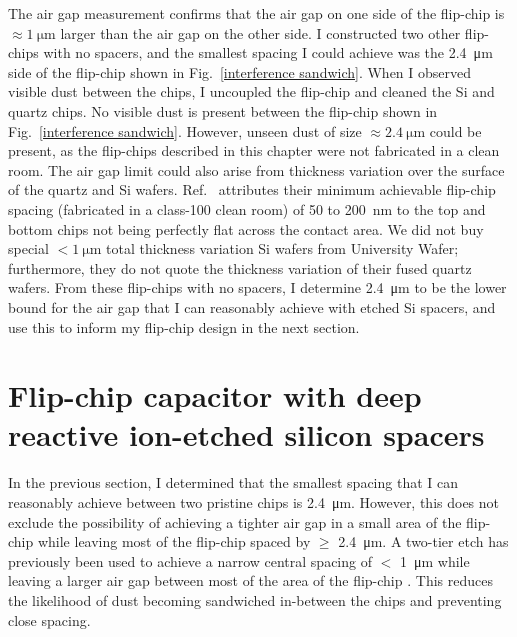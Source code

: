 \documentclass{beavtex_dub_edit}
\begin{document}
The air gap measurement confirms that the air gap on one side of the flip-chip is $\approx \SI{1}{\micro\meter}$ larger than the air gap on the other side. I constructed two other flip-chips with no spacers, and the smallest spacing I could achieve was the \SI{2.4}{\micro\meter} side of the flip-chip shown in Fig.\ \ref{interference sandwich}. When I observed visible dust between the chips, I uncoupled the flip-chip and cleaned the Si and quartz chips. No visible dust is present between the flip-chip shown in Fig.\ \ref{interference sandwich}. However, unseen dust of size $\approx \SI{2.4}{\micro\meter}$ could be present, as the flip-chips described in this chapter were not fabricated in a clean room. The air gap limit could also arise from thickness variation over the surface of the quartz and Si wafers. Ref.\ \cite{bennaceur_mechanical_2015} attributes their minimum achievable flip-chip spacing (fabricated in a class-100 clean room) of 50 to \SI{200}{\nano\meter} to the top and bottom chips not being perfectly flat across the contact area. We did not buy special $< \SI{1}{\micro\meter}$ total thickness variation Si wafers from University Wafer; furthermore, they do not quote the thickness variation of their fused quartz wafers. From these flip-chips with no spacers, I determine \SI{2.4}{\micro\meter} to be the lower bound for the air gap that I can reasonably achieve with etched Si spacers, and use this to inform my flip-chip design in the next section.


\section{Flip-chip capacitor with deep reactive ion-etched silicon spacers} \label{FC SIspacer}
In the previous section, I determined that the smallest spacing that I can reasonably achieve between two pristine chips is \SI{2.4}{\micro\meter}. However, this does not exclude the possibility of achieving a tighter air gap in a small area of the flip-chip while leaving most of the flip-chip spaced by $\geq$ \SI{2.4}{\micro\meter}. A two-tier etch has previously been used to achieve a narrow central spacing of $<$ \SI{1}{\micro\meter} while leaving a larger air gap between most of the area of the flip-chip \cite{beukman_noninvasive_2015}. This reduces the likelihood of dust becoming sandwiched in-between the chips and preventing close spacing. 
\end{document}
